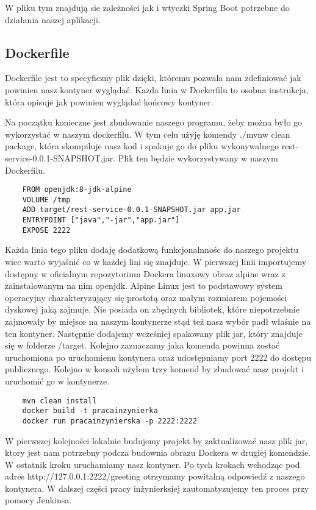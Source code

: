 W pliku tym znajdują sie zależności jak i wtyczki Spring Boot potrzebne do działania naszej aplikacji. 

\subsection{Dockerfile} 

Dockerfile jest to specyficzny plik dzięki, któremu pozwala nam zdefiniować jak powinien nasz kontyner wyglądać. Każda linia w Dockerfilu to osobna instrukcja, która opisuje jak powinien wyglądać końcowy kontyner. 

Na początku konieczne jest zbudowanie naszego programu, żeby można było go wykorzystać w naszym dockerfilu. W tym celu użyję komendy ./mvnw clean package, która skompiluje nasz kod i spakuje go do pliku wykonywalnego rest-service-0.0.1-SNAPSHOT.jar. Plik ten będzie wykorzystywany w naszym Dockerfilu. 

\begin{lstlisting}
    FROM openjdk:8-jdk-alpine
    VOLUME /tmp
    ADD target/rest-service-0.0.1-SNAPSHOT.jar app.jar
    ENTRYPOINT ["java","-jar","app.jar"]
    EXPOSE 2222
\end{lstlisting}


Każda linia tego pliku dodaję dodatkową funkcjonalnnośc do naszego projektu wiec warto wyjaśnić co w każdej lini się znajduje. W pierwszej linii importujemy dostępny w oficialnym repozytorium Dockera linuxowy obraz alpine wraz z zainstalowanym na nim openjdk. Alpine Linux jest to podstawowy system operacyjny charakteryzujący się prostotą oraz małym rozmiarem pojemości dyskowej jaką zajmuje. Nie posiada on zbędnych bibliotek, które niepotrzebnie zajmowały by miejsce na naszym kontynerze stąd też nasz wybór padł właśnie na ten kontyner. Następnie dodajemy wcześniej spakowany plik jar, który znajduje się w folderze /target. Kolejno zaznaczamy jaka komenda powinna zostać uruchomiona po uruchomienu kontynera oraz udostępniamy port 2222 do dostępu publicznego. 
Kolejno w konsoli użyłem trzy komend by zbudować nasz projekt i uruchomić go w kontynerze. 
\begin{lstlisting}
    mvn clean install 
    docker build -t pracainzynierka
    docker run pracainzynierska -p 2222:2222
\end{lstlisting}
W pierwszej kolejności lokalnie budujemy projekt by zaktualizować nasz plik jar, ktory jest nam potrzebny podcza budownia obrazu Dockera w drugiej komendzie. W ostatnik kroku uruchamiamy nasz kontyner. Po tych krokach wchodząc pod adres http://127.0.0.1:2222/greeting otrzymamy powitalną odpowiedź z naszego kontynera. 
W dalszej części pracy inżynierksiej zautomatyzujemy ten proces przy pomocy Jenkinsa. 

